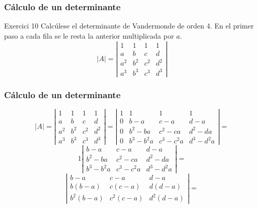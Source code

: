 \documentclass[12pt]{article}
\begin{document}
\begin{frame}
  \frametitle{C\'alculo de un determinante}
     \begin{block}{Exercici 10}
Calc\'ulese el determinante de Vandermonde de orden 4. En el primer paso a cada fila se le resta la anterior multiplicada por $a$.
\[|A| = \left|\begin{array}{cccc}1 & 1 & 1 & 1 \\ a & b & c & d \\ a^2 & b^2 & c^2 & d^2 \\a^3 & b^3 & c^3 & d^3 \end{array}\right|\]
\end{block}
\end{frame} 

\begin{frame}
  \frametitle{C\'alculo de un determinante}
\[|A| = \left|\begin{array}{cccc}1 & 1 & 1 & 1 \\ a & b & c & d \\ a^2 & b^2 & c^2 & d^2 \\a^3 & b^3 & c^3 & d^3 \end{array}\right| = \left|\begin{array}{cccc}1 & 1 & 1 & 1 \\ 0 & b-a & c-a & d-a \\ 0 & b^2-ba & c^2-ca & d^2-da \\0 & b^3-b^2a & c^3-c^2a & d^3-d^2a \end{array}\right| = \]
\[1\left|\begin{array}{ccc} b-a & c-a & d-a \\ b^2-ba & c^2-ca & d^2-da \\b^3-b^2a & c^3-c^2a & d^3-d^2a \end{array}\right| = \]
\[\left|\begin{array}{ccc} b-a & c-a & d-a \\ b(b-a) & c(c-a) & d(d-a) \\b^2(b-a) & c^2(c-a) & d^2(d-a) \end{array}\right| =\]

\end{frame} 
\end{document}
